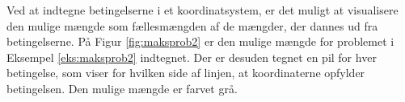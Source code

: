\begin{eks}
Ved at indtegne betingelserne i et koordinatsystem, er det muligt at visualisere den mulige mængde som fællesmængden af de mængder, der dannes ud fra betingelserne. På Figur \ref{fig:maksprob2} er den mulige mængde for problemet i Eksempel \ref{eks:maksprob2} indtegnet. Der er desuden tegnet en pil for hver betingelse, som viser for hvilken side af linjen, at koordinaterne opfylder betingelsen. Den mulige mængde er farvet grå.

\begin{center}
	
	\label{fig:maksprob2}
\end{center}

\end{eks}

